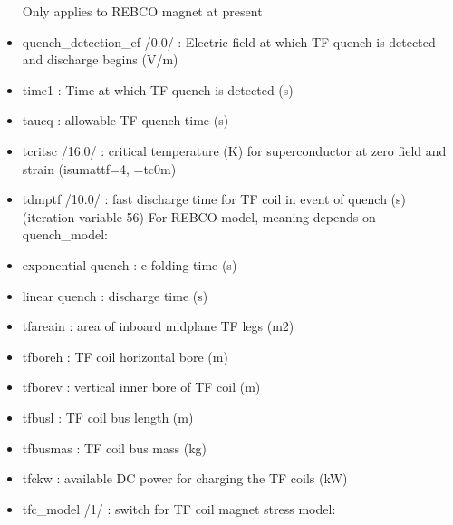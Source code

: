 \documentclass[]{article}
\begin{document}
\begin{itemize}
  Only applies to REBCO magnet at present
\item
  quench\_detection\_ef /0.0/ : Electric field at which TF quench is
  detected and discharge begins (V/m)
\item
  time1 : Time at which TF quench is detected (s)
\item
  taucq : allowable TF quench time (s)
\item
  tcritsc /16.0/ : critical temperature (K) for superconductor at zero
  field and strain (isumattf=4, =tc0m)
\item
  tdmptf /10.0/ : fast discharge time for TF coil in event of quench (s)
  (iteration variable 56) For REBCO model, meaning depends on
  quench\_model:
\item
  exponential quench : e-folding time (s)
\item
  linear quench : discharge time (s)
\item
  tfareain : area of inboard midplane TF legs (m2)
\item
  tfboreh : TF coil horizontal bore (m)
\item
  tfborev : vertical inner bore of TF coil (m)
\item
  tfbusl : TF coil bus length (m)
\item
  tfbusmas : TF coil bus mass (kg)
\item
  tfckw : available DC power for charging the TF coils (kW)
\item
  tfc\_model /1/ : switch for TF coil magnet stress model:


\end{itemize}
\end{document}

